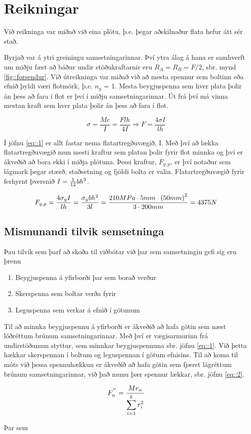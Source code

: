 \section{Reikningar}\label{ch::reikningar}

Við reikninga var miðað við eina plötu, þ.e. þegar aðskilnaður flata hefur átt sér stað. 

Byrjað var á ytri greiningu samsetningarinnar. Því ytra álag á hana er samhverft um miðju fæst að báður undir stöðukraftarnir eru $R_{A} = R_{B} = F/2$, sbr. mynd \ref{fig::forsendur}. Við útreikninga var miðað við að mesta spennur sem boltinn eða efnið þyldi væri flotmörk, þ.e. $n_y$ = 1. Mesta beygjuspenna sem hver plata þolir án þess að fara í flot er því í miðju samsetningarinnar. Út frá því má vinna mestan kraft sem hver plata þolir án þess að fara í flot.

\begin{equation}
	\sigma = \frac{M c}{I} = \frac{F l h}{4I} \Rightarrow F = \frac{4 \sigma I}{l h}
	\label{eq::1}
\end{equation}

Í jöfnu \ref{eq::1} er allt fastar nema flatartregðuvægið, I. Með því að lækka flatartregðuvægið mun mesti kraftur sem platan þolir fyrir flot minnka og því er ákveðið að bora ekki í miðja plötuna. Þessi kraftur, $F_{y,p}$, er því notaður sem lágmark þegar stærð, staðsetning og fjöldi bolta er valin. Flatartregðuvægið fyrir ferhyrnt þversnið $I = {1 \over 12}bh^3$.

\[
	F_{y,p} = \frac{4  \sigma_y I}{l h} = {\sigma_y b h^2 \over 3 l} = {210 MPa \cdot 5 mm \cdot \left(50mm\right)^2 \over 3 \cdot 200mm} = 4375N
\]

\subsection{Mismunandi tilvik semsetninga}

Þau tilvik sem þarf að skoða til viðbótar við þar sem samsetningin gefi sig eru þrenn

\begin{enumerate}
	\item Beygjuspenna á yfirborði þar sem borað verður
	\item Skerspenna sem boltar verða fyrir
	\item Leguspenna sem verkar á efnið í götunum
\end{enumerate}

Til að minnka beygjuspennu á yfirborði er ákveðið að hafa götin sem næst lóðréttum brúnum samsetningarinnar. Með því er vægisarmurinn frá undirstöðunum styttur, sem minnkar beygjuspennuna sbr. jöfnu \ref{eq::1}. Við þetta hækkar skerspennan í boltum og leguspennan í götum efnisins. Til að koma til móts við þessa spennuhækkun er ákveðið að hafa götin sem fjærst lágréttum brúnum samsetningarinnar, við það munu þær spennur lækkar, sbr. jöfnu \ref{eq::2}.

\begin{equation}
	F_n^{''} = {M r_n \over \displaystyle\sum_{i=1}^{k} r_i^2}
	\label{eq::2}
\end{equation}

Þar sem 